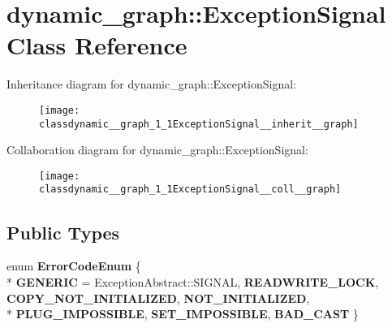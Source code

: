\hypertarget{classdynamic__graph_1_1ExceptionSignal}{}\section{dynamic\+\_\+graph\+:\+:Exception\+Signal Class Reference}
\label{classdynamic__graph_1_1ExceptionSignal}


Inheritance diagram for dynamic\+\_\+graph\+:\+:Exception\+Signal\+:
\nopagebreak
\begin{figure}[H]
\begin{center}
\leavevmode
\texttt{[image: classdynamic\_\_graph\_1\_1ExceptionSignal\_\_inherit\_\_graph]}
\end{center}
\end{figure}


Collaboration diagram for dynamic\+\_\+graph\+:\+:Exception\+Signal\+:
\nopagebreak
\begin{figure}[H]
\begin{center}
\leavevmode
\texttt{[image: classdynamic\_\_graph\_1\_1ExceptionSignal\_\_coll\_\_graph]}
\end{center}
\end{figure}
\subsection*{Public Types}
\begin{DoxyCompactItemize}
\item 
enum {\bfseries Error\+Code\+Enum} \{ \\*
{\bfseries G\+E\+N\+E\+R\+IC} = Exception\+Abstract\+:\+:S\+I\+G\+N\+AL, 
{\bfseries R\+E\+A\+D\+W\+R\+I\+T\+E\+\_\+\+L\+O\+CK}, 
{\bfseries C\+O\+P\+Y\+\_\+\+N\+O\+T\+\_\+\+I\+N\+I\+T\+I\+A\+L\+I\+Z\+ED}, 
{\bfseries N\+O\+T\+\_\+\+I\+N\+I\+T\+I\+A\+L\+I\+Z\+ED}, 
\\*
{\bfseries P\+L\+U\+G\+\_\+\+I\+M\+P\+O\+S\+S\+I\+B\+LE}, 
{\bfseries S\+E\+T\+\_\+\+I\+M\+P\+O\+S\+S\+I\+B\+LE}, 
{\bfseries B\+A\+D\+\_\+\+C\+A\+ST}
 \}\hypertarget{classdynamic__graph_1_1ExceptionSignal_a122fbe147d0fd92c511f5839394e2bc1}{}\label{classdynamic__graph_1_1ExceptionSignal_a122fbe147d0fd92c511f5839394e2bc1}

\end{DoxyCompactItemize}
